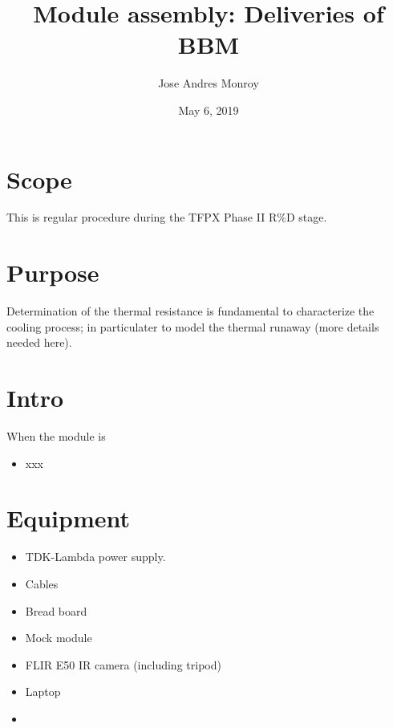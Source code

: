 \documentclass[12pt]{unlsilabsop}
\title{Module assembly: Deliveries of BBM}
\date{May 6, 2019}
\author{Jose Andres Monroy}
\begin{document}
\maketitle

\section{Scope}
This is regular procedure during the TFPX Phase II R\%D stage.

\section{Purpose}
Determination of the thermal resistance is fundamental to characterize the cooling process; in particulater to model the thermal runaway (more details needed here).


\section{Intro}
When the module is  
\begin{itemize}
    \item xxx
\end{itemize}

\section{Equipment}

\begin{itemize}
    \item TDK-Lambda power supply.  
    \item Cables
    \item Bread board
    \item Mock module
    \item FLIR E50 IR camera (including tripod)
    \item Laptop
    \item 
\end{itemize}
\end{document}
